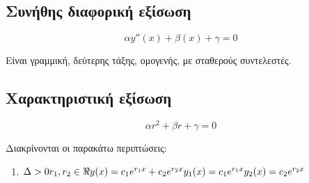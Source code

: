 \documentclass[12pt]{extarticle}
\begin{document}
\subsection{Συνήθης διαφορική εξίσωση}

\begin{equation*}
    \alpha y''(x) + \beta (x)+ \gamma = 0
\end{equation*}

Είναι γραμμική, δεύτερης τάξης, ομογενής, με σταθερούς συντελεστές.


\subsection{Χαρακτηριστική εξίσωση}

\begin{equation*}
    \alpha r^2 + \beta r + \gamma = 0
\end{equation*}

Διακρίνονται οι παρακάτω περιπτώσεις:
\begin{enumerate}
\item $
    \Delta > 0 \\
    r_1, r_2 \in \Re \\
    y(x) = c_1 e^{r_1x} + c_2 e^{r_2x} \\
    y_1(x) = c_1 e^{r_1x} \\
    y_2(x) = c_2 e^{r_2x}
$
\end{enumerate}
\end{document}
